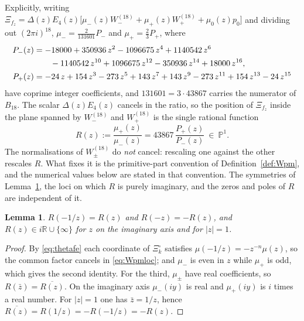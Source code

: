 \documentclass[11pt]{article}
\newtheorem{lemma}[theorem]{Lemma}
\newcommand{\RR}{\mathbb{R}}
\begin{document}
Explicitly, writing
$\Xi_{f_z}=\Delta(z)E_4(z)\big[\mu_-(z)W^{(18)}_-+\mu_+(z)W^{(18)}_++\mu_0(z)p_0\big]$ and
dividing out $(2\pi i)^{18}$,
$\mu_-=\tfrac{2}{131601}P_-$ and $\mu_+=\tfrac{2}{3}P_+$, where
\begin{align}
P_-(z)&={-}18000+350936\,z^2-1096675\,z^4+1140542\,z^6\notag\\
&\qquad-1140542\,z^{10}+1096675\,z^{12}-350936\,z^{14}+18000\,z^{16},\label{eq:mum}\\
P_+(z)&={-}24\,z+154\,z^3-273\,z^5+143\,z^7+143\,z^9-273\,z^{11}
+154\,z^{13}-24\,z^{15}\label{eq:mup}
\end{align}
have coprime integer coefficients, and $131601=3\cdot43867$ carries the numerator of $B_{18}$. The
scalar $\Delta(z)E_4(z)$ cancels in the ratio, so the position of $\Xi_{f_z}$ inside the plane
spanned by $W^{(18)}_-$ and $W^{(18)}_+$ is the single rational function
\begin{equation}\label{eq:Wpmloc}
R(z):=\frac{\mu_+(z)}{\mu_-(z)}=43867\,\frac{P_+(z)}{P_-(z)}\ \in\ \mathbb P^1 .
\end{equation}
The normalisations of $W^{(18)}_\pm$ do \emph{not} cancel: rescaling one against the other rescales
$R$. What fixes it is the primitive-part convention of Definition~\ref{def:Wpm}, and the numerical
values below are stated in that convention. The symmetries of Lemma~\ref{lem:Wpmloc}, the loci on
which $R$ is purely imaginary, and the zeros and poles of $R$ are independent of it.

\begin{lemma}\label{lem:Wpmloc}
$R(-1/z)=R(z)$ and $R(-z)=-R(z)$, and $R(z)\in i\RR\cup\{\infty\}$ for $z$ on the imaginary axis
and for $|z|=1$.
\end{lemma}

\begin{proof}
By \eqref{eq:thetafe} each coordinate of $\Xi^\circ_k$ satisfies $\mu(-1/z)=-z^{-n}\mu(z)$, so the
common factor cancels in \eqref{eq:Wpmloc}; and $\mu_-$ is even in $z$ while $\mu_+$ is odd, which
gives the second identity. For the third, $\mu_\pm$ have real coefficients, so
$R(\bar z)=\overline{R(z)}$. On the imaginary axis $\mu_-(iy)$ is real and $\mu_+(iy)$ is $i$ times
a real number. For $|z|=1$ one has $\bar z=1/z$, hence
$\overline{R(z)}=R(1/z)=-R(-1/z)=-R(z)$.
\end{proof}
\end{document}
